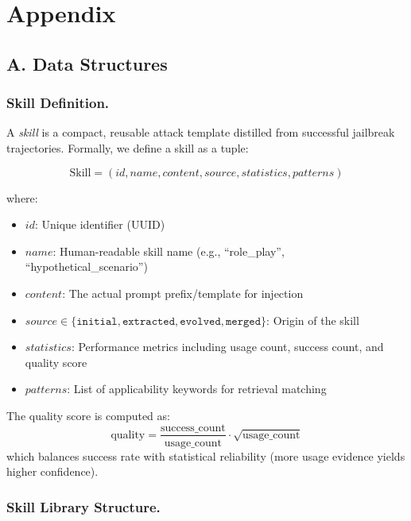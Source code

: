 \documentclass[letterpaper]{article}
\begin{document}
\section*{Appendix}
\label{sec:appendix}

\subsection{A. Data Structures}
\label{sec:data_structures}

\subsubsection{Skill Definition.}

A \textit{skill} is a compact, reusable attack template distilled from successful jailbreak trajectories. Formally, we define a skill as a tuple:

\begin{equation}
\text{Skill} = (id, name, content, source, statistics, patterns)
\end{equation}

where:
\begin{itemize}[leftmargin=*]
    \item $id$: Unique identifier (UUID)
    \item $name$: Human-readable skill name (e.g., ``role\_play'', ``hypothetical\_scenario'')
    \item $content$: The actual prompt prefix/template for injection
    \item $source \in \{\texttt{initial}, \texttt{extracted}, \texttt{evolved}, \texttt{merged}\}$: Origin of the skill
    \item $statistics$: Performance metrics including usage count, success count, and quality score
    \item $patterns$: List of applicability keywords for retrieval matching
\end{itemize}

The quality score is computed as:
\begin{equation}
\text{quality} = \frac{\text{success\_count}}{\text{usage\_count}} \cdot \sqrt{\text{usage\_count}}
\end{equation}
which balances success rate with statistical reliability (more usage evidence yields higher confidence).

\subsubsection{Skill Library Structure.}
\end{document}
